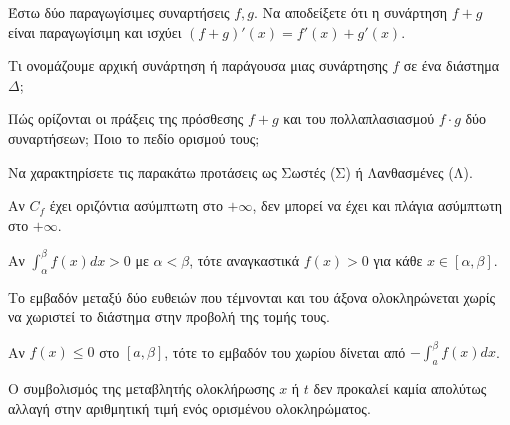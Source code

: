 \documentclass[11pt,a4paper]{article}
\newcommand{\kerkissans}[1]{{\fontfamily{maksf}\selectfont \textbf{#1}}}
\newcommand{\dint}{\displaystyle\int}
\newcommand\themanum{A}
\newcounter{thema}[section]
\renewcommand{\thethema}{\arabic{thema}}
\newcommand{\Thema}{\refstepcounter{thema}{\textbf{\textcolor{black}{\faPenSquare\ \  \large \kerkissans{\textbf{\thethemaο\hspace{2mm}Διαγώνισμα - Θέμα \themanum}}}}}\hspace{0mm}}{}
\newenvironment{thema}[1]
{\begin{tcolorbox}[title=\Thema\kerkissans{\textbf{\large{  #1}}},breakable,
enhanced standard,titlerule=0pt,toprule=0pt, rightrule=0pt, bottomrule=0pt,
colback=white,left=0mm,top=1mm,bottom=0mm,
boxrule=0pt,
colframe=white,leftrule=0mm,sharp corners,coltitle=black]
\renewcommand{\themanum}{#1}}
{\end{tcolorbox}}
\begin{document}
\begin{thema}{A}
\begin{erwthma}
    \item Έστω δύο παραγωγίσιμες συναρτήσεις $f, g$. Να αποδείξετε ότι η συνάρτηση $f+g$ είναι παραγωγίσιμη και ισχύει $(f+g)'(x) = f'(x) + g'(x)$.
    \item Τι ονομάζουμε αρχική συνάρτηση ή παράγουσα μιας συνάρτησης $f$ σε ένα διάστημα $\Delta$;
    \item Πώς ορίζονται οι πράξεις της πρόσθεσης $f+g$ και του πολλαπλασιασμού $f \cdot g$ δύο συναρτήσεων; Ποιο το πεδίο ορισμού τους;
    \item Να χαρακτηρίσετε τις παρακάτω προτάσεις ως Σωστές (Σ) ή Λανθασμένες (Λ).
    \begin{alist}
        \item Αν $C_f$ έχει οριζόντια ασύμπτωτη στο $+\infty$, δεν μπορεί να έχει και πλάγια ασύμπτωτη στο $+\infty$.
        \item Αν $\dint_\alpha^\beta f(x)dx > 0$ με $\alpha < \beta$, τότε αναγκαστικά $f(x) > 0$ για κάθε $x \in [\alpha, \beta]$.
        \item Το εμβαδόν μεταξύ δύο ευθειών που τέμνονται και του άξονα ολοκληρώνεται χωρίς να χωριστεί το διάστημα στην προβολή της τομής τους.
        \item Αν $f(x) \le 0$ στο $[a, \beta]$, τότε το εμβαδόν του χωρίου δίνεται από $-\dint_a^\beta f(x) dx$.
        \item Ο συμβολισμός της μεταβλητής ολοκλήρωσης $x$ ή $t$ δεν προκαλεί καμία απολύτως αλλαγή στην αριθμητική τιμή ενός ορισμένου ολοκληρώματος.
    \end{alist}

\end{erwthma}
\end{thema}
\vspace{1cm}
\end{document}
